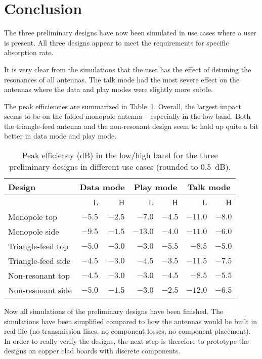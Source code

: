 \section{Conclusion}
The three preliminary designs have now been simulated in use cases where a user is present. All three designs appear to meet the requirements for specific absorption rate.

It is very clear from the simulations that the user has the effect of detuning the resonances of all antennas. The talk mode had the most severe effect on the antennas where the data and play modes were slightly more subtle.

The peak efficiencies are summarized in Table~\ref{tab:peakefficiencycomp}. Overall, the largest impact seems to be on the folded monopole antenna -- especially in the low band. Both the triangle-feed antenna and the non-resonant design seem to hold up quite a bit better in data mode and play mode.

\begin{table}[htbp]
    \centering
    \begin{tabular}{|l|r|r|r|r|r|r|}
        \hline
        Design             & \multicolumn{2}{c|}{Data mode}   & \multicolumn{2}{c|}{Play mode}   & \multicolumn{2}{c|}{Talk mode} \\
        \hline
         & L & H & L & H & L & H \\
        \hline
        Monopole top       & $-5.5$ & $-2.5$ & $-7.0 $  & $-4.5$ & $-11.0  $ & $-8.0$ \\
        Monopole side      & $-9.5$ & $-1.5$ & $-13.0 $ & $-4.0$ & $-11.0  $ & $-6.0$ \\
        \hline
        Triangle-feed top  & $-5.0$ & $-3.0$ & $-3.0  $ & $-5.5$ & $-8.5 $   & $-5.0$ \\
        Triangle-feed side & $-4.5$ & $-3.0$ & $-4.5$   & $-3.5$ & $-11.5$   & $-7.5$ \\
        \hline
        Non-resonant top   & $-4.5$ & $-3.0$ & $-3.0  $ & $-4.5$ & $-8.5 $   & $-5.5$ \\
        Non-resonant side  & $-5.0$ & $-1.5$ & $-3.0 $  & $-2.5$ & $-12.0  $ & $-6.5$ \\
        \hline
    \end{tabular}
    \caption{Peak efficiency (dB) in the low/high band for the three preliminary designs in different use cases (rounded to \SI{0.5}{dB}).}
    \label{tab:peakefficiencycomp}
\end{table}

Now all simulations of the preliminary designs have been finished. The simulations have been simplified compared to how the antennas would be built in real life (no transmission lines, no component losses, no component placement). In order to really verify the designs, the next step is therefore to prototype the designs on copper clad boards with discrete components.
